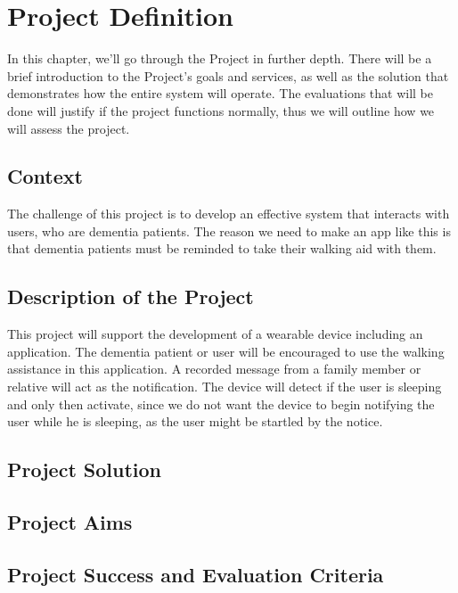 \chapter{Project Definition}
\label{chap:proj-def}

In this chapter, we'll go through the Project in further depth. There will be a brief introduction to the Project's goals and services, as well as the solution that demonstrates how the entire system will operate. The evaluations that will be done will justify if the project functions normally, thus we will outline how we will assess the project.

\section{Context}

The challenge of this project is to develop an effective system that interacts with users, who are dementia patients. The reason we need to make an app like this is that dementia patients must be reminded to take their walking aid with them.


\section{Description of the Project}

This project will support the development of a wearable device including an application. The dementia patient or user will be encouraged to use the walking assistance in this application. A recorded message from a family member or relative will act as the notification. The device will detect if the user is sleeping and only then activate, since we do not want the device to begin notifying the user while he is sleeping, as the user might be startled by the notice.

\section{Project Solution}

\section{Project Aims}

\section{Project Success and Evaluation Criteria}
